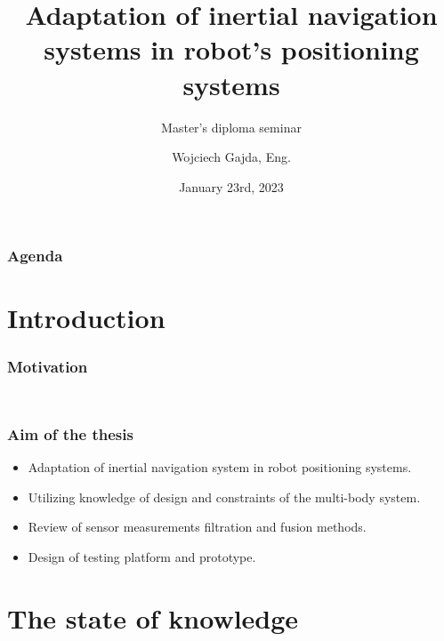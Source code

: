 \documentclass[aspectratio=169]{beamer}
\title{Adaptation of inertial navigation systems in robot's positioning systems}
\subtitle{Master's diploma seminar}
\author{Wojciech Gajda, Eng.}
\date{January 23rd, 2023} %
\begin{document}
\sloppy

{
\maketitleframe 
}

\begin{frame}
\frametitle{Agenda}
  \tableofcontents[  
    sectionstyle=show, 
    ]
\end{frame}

\section{Introduction}

\begin{frame}
	\frametitle{Motivation}
	\begin{columns}
		\begin{column}{0.5\textwidth}
			\begin{figure}
				\centering
			\end{figure}
			\vspace{50pt}
		\end{column}
		\begin{column}{0.5\textwidth}
			\begin{figure}
				\centering
			\end{figure}
			\vspace{50pt}
		\end{column}
	\end{columns}
\end{frame}


\begin{frame}
	\frametitle{Aim of the thesis}
	\begin{itemize}
		\setlength\itemsep{1em}
		\item<2-> Adaptation of inertial navigation system in robot positioning systems.
		\item<3-> Utilizing knowledge of design and constraints of the multi-body system.
		\item<4-> Review of sensor measurements filtration and fusion methods.
		\item<5-> Design of testing platform and prototype.
	\end{itemize}
\end{frame}

\section{The state of knowledge}
\end{document}
